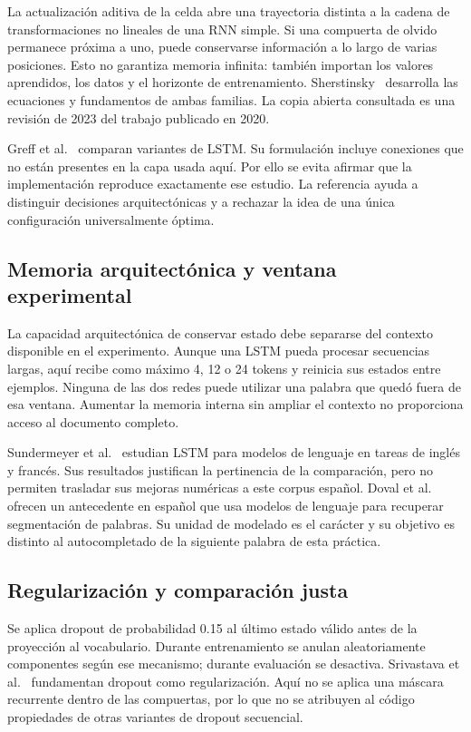 La actualización aditiva de la celda abre una trayectoria distinta a
la cadena de transformaciones no lineales de una RNN simple. Si una
compuerta de olvido permanece próxima a uno, puede conservarse información
a lo largo de varias posiciones. Esto no garantiza memoria infinita:
también importan los valores aprendidos, los datos y el horizonte de
entrenamiento. Sherstinsky~\cite{sherstinsky2020} desarrolla las ecuaciones
y fundamentos de ambas familias. La copia abierta consultada es una
revisión de 2023 del trabajo publicado en 2020.

Greff et al.~\cite{greff2017} comparan variantes de LSTM. Su formulación
incluye conexiones que no están presentes en la capa usada aquí. Por ello
se evita afirmar que la implementación reproduce exactamente ese estudio.
La referencia ayuda a distinguir decisiones arquitectónicas y a rechazar
la idea de una única configuración universalmente óptima.

\subsection{Memoria arquitectónica y ventana experimental}
La capacidad arquitectónica de conservar estado debe separarse del
contexto disponible en el experimento. Aunque una LSTM pueda procesar
secuencias largas, aquí recibe como máximo 4, 12 o 24 tokens y reinicia
sus estados entre ejemplos. Ninguna de las dos redes puede utilizar una
palabra que quedó fuera de esa ventana. Aumentar la memoria interna sin
ampliar el contexto no proporciona acceso al documento completo.

Sundermeyer et al.~\cite{sundermeyer2012} estudian LSTM para modelos de
lenguaje en tareas de inglés y francés. Sus resultados justifican la
pertinencia de la comparación, pero no permiten trasladar sus mejoras
numéricas a este corpus español. Doval et al.~\cite{doval2016} ofrecen
un antecedente en español que usa modelos de lenguaje para recuperar
segmentación de palabras. Su unidad de modelado es el carácter y su
objetivo es distinto al autocompletado de la siguiente palabra de esta
práctica.

\subsection{Regularización y comparación justa}
Se aplica dropout de probabilidad 0.15 al último estado válido antes de
la proyección al vocabulario. Durante entrenamiento se anulan
aleatoriamente componentes según ese mecanismo; durante evaluación se
desactiva. Srivastava et al.~\cite{srivastava2014} fundamentan dropout
como regularización. Aquí no se aplica una máscara recurrente dentro de
las compuertas, por lo que no se atribuyen al código propiedades de otras
variantes de dropout secuencial.

